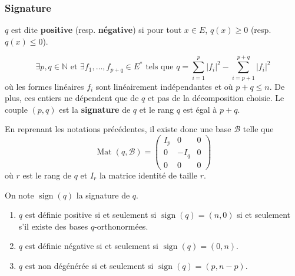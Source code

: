   \subsubsection{Signature}

  \begin{definition}
    $q$ est dite \textbf{positive} (resp. \textbf{négative}) si pour tout $x \in E$, $q(x) \geq 0$ (resp. $q(x) \leq 0$).
  \end{definition}


  \begin{theorem}
    \[ \exists p, q \in \mathbb{N} \text{ et } \exists f_1, \dots, f_{p+q} \in E^* \text{ tels que } q = \sum_{i=1}^p |f_i|^2 - \sum_{i=p+1}^{p+q} |f_i|^2 \]
    où les formes linéaires $f_i$ sont linéairement indépendantes et où $p + q \leq n$. De plus, ces entiers ne dépendent que de $q$ et pas de la décomposition choisie.
    \newpar
    Le couple $(p,q)$ est la \textbf{signature} de $q$ et le rang $q$ est égal à $p+q$.
  \end{theorem}

  \begin{remark}
    En reprenant les notations précédentes, il existe donc une base $\mathcal{B}$ telle que
    \[
    \operatorname{Mat}(q, \mathcal{B}) =
    \begin{pmatrix}
      I_p & 0 & 0 \\
      0 & -I_q & 0 \\
      0 & 0 & 0
    \end{pmatrix}
    \]
    où $r$ est le rang de $q$ et $I_r$ la matrice identité de taille $r$.
  \end{remark}


  \begin{corollary}
    On note $\operatorname{sign}(q)$ la signature de $q$.
    \begin{enumerate}[label=(\roman*)]
      \item $q$ est définie positive si et seulement si $\operatorname{sign}(q) = (n, 0)$ si et seulement s'il existe des bases $q$-orthonormées.
      \item $q$ est définie négative si et seulement si $\operatorname{sign}(q) = (0, n)$.
      \item $q$ est non dégénérée si et seulement si $\operatorname{sign}(q) = (p, n-p)$.
    \end{enumerate}
  \end{corollary}

